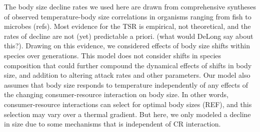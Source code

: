 \documentclass[11pt]{article}
\begin{document}
The body size decline rates we used here are drawn from comprehensive syntheses of observed temperature-body size correlations in organisms ranging from fish to microbes (refs). Most evidence for the TSR is empirical, not theoretical, and the rates of decline are not (yet) predictable a priori. (what would DeLong say about this?). Drawing on this evidence, we considered effects of body size shifts within species over generations. This model does not consider shifts in species composition that could further compound the dynamical effects of shifts in body size, and addition to altering attack rates and other parameters. Our model also assumes that body size responds to temperature independently of any effects of the changing consumer-resource interaction on body size. In other words, consumer-resource interactions can select for optimal body sizes (REF), and this selection may vary over a thermal gradient. But here, we only modeled a decline in size due to some mechanisms that is independent of CR interaction.
%
%
%
%
\end{document}
